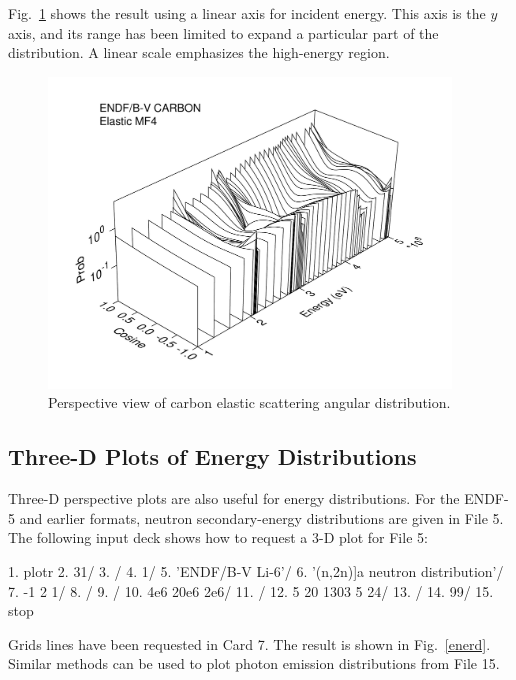 \noindent
Fig.~\ref{angd} shows the result using a linear axis for incident
energy.  This axis is the $y$ axis, and its range has been limited to
expand a particular part of the distribution.  A linear scale emphasizes
the high-energy region.

\begin{figure}[b]\centering
\includegraphics[keepaspectratio, height=3.25in, angle=0]{figs/plotr8ack}
\caption[Sample 3-D plot of angular distribution data]{Perspective view
 of carbon elastic scattering angular distribution.}
\label{angd}
\end{figure}


\subsection{Three-D Plots of Energy Distributions}
\label{ssPLOTR_3D_energydist}

Three-D perspective plots are also useful for energy distributions.
For the ENDF-5 and earlier formats, neutron secondary-energy
distributions are given in File 5.  The following input deck
shows how to request a 3-D plot for File 5:

\small
\begin{ccode}

   1.  plotr
   2.  31/
   3.  /
   4.  1/
   5.  'ENDF/B-V Li-6'/
   6.  '(n,2n)]a neutron distribution'/
   7.  -1 2 1/
   8.  /
   9.  /
  10.  4e6 20e6 2e6/
  11.  /
  12.  5 20 1303 5 24/
  13.  /
  14.  99/
  15.  stop

\end{ccode}
\normalsize

\noindent
Grids lines have been requested in Card 7.  The result is shown in
Fig.~\ref{enerd}.  Similar methods can be used to plot photon emission
distributions from File 15.

